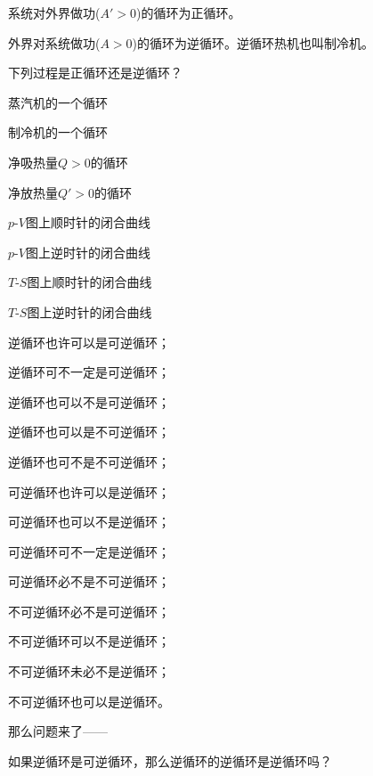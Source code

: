 \documentclass[CJK]{beamer}
\begin{document}
\begin{frame}
\bch

系统对外界做功($A'>0$)的循环为正循环。

\ech
\end{frame}

\begin{frame}
\bch

外界对系统做功($A>0$)的循环为逆循环。逆循环热机也叫制冷机。

\ech
\end{frame}

\begin{frame}
\bch
下列过程是正循环还是逆循环？
\bitem
\item{蒸汽机的一个循环}
\item{制冷机的一个循环}
\item{净吸热量$Q>0$的循环}
\item{净放热量$Q'>0$的循环}
\item{$p$-$V$图上顺时针的闭合曲线}
\item{$p$-$V$图上逆时针的闭合曲线}
\item{$T$-$S$图上顺时针的闭合曲线}
\item{$T$-$S$图上逆时针的闭合曲线}
\eitem
\ech
\end{frame}


\begin{frame}
\bch

逆循环也许可以是可逆循环；

逆循环可不一定是可逆循环；

逆循环也可以不是可逆循环；

逆循环也可以是不可逆循环；

逆循环也可不是不可逆循环；

可逆循环也许可以是逆循环；

可逆循环也可以不是逆循环；

可逆循环可不一定是逆循环；

可逆循环必不是不可逆循环；

不可逆循环必不是可逆循环；

不可逆循环可以不是逆循环；

不可逆循环未必不是逆循环；

不可逆循环也可以是逆循环。

那么问题来了——

如果逆循环是可逆循环，那么逆循环的逆循环是逆循环吗？




\ech
\end{frame}
\end{document}
